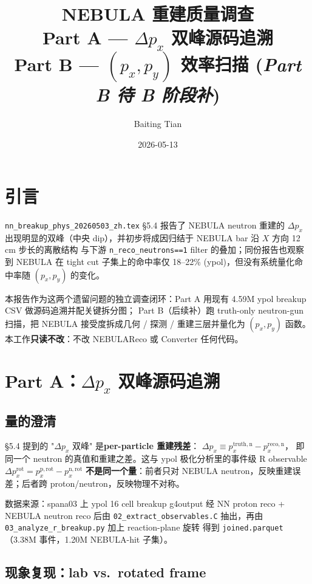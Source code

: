 \documentclass[a4paper,11pt]{ctexart}
\title{NEBULA 重建质量调查\\
       Part A --- $\Delta p_x$ 双峰源码追溯\\
       Part B --- $(p_x,p_y)$ 效率扫描 (\textit{Part B 待 B 阶段补}) }
\author{Baiting Tian}
\date{2026-05-13}
\begin{document}
\maketitle
\tableofcontents

\section{引言}

\texttt{nn\_breakup\_phys\_20260503\_zh.tex} \S5.4 报告了 NEBULA neutron 重建的 $\Delta p_x$
出现明显的双峰（中央 dip），并初步将成因归结于 NEBULA bar 沿 $X$ 方向 12 cm 步长的离散结构
与下游 \texttt{n\_reco\_neutrons==1} filter 的叠加；同份报告也观察到 NEBULA 在 tight cut 子集上的命中率仅
18--22\% (ypol)，但没有系统量化命中率随 $(p_x, p_y)$ 的变化。

本报告作为这两个遗留问题的独立调查闭环：Part A 用现有 4.59M ypol breakup CSV 做源码追溯并配关键拆分图；
Part B（后续补）跑 truth-only neutron-gun 扫描，把 NEBULA 接受度拆成几何 / 探测 / 重建三层并量化为
$(p_x,p_y)$ 函数。本工作\textbf{只读不改}：不改 NEBULAReco 或 Converter 任何代码。

\section{Part A：$\Delta p_x$ 双峰源码追溯}

\subsection{量的澄清}

\S5.4 提到的 "$\Delta p_x$ 双峰" 是\textbf{per-particle 重建残差}：
$\Delta p_x \equiv p_x^{\mathrm{truth,n}} - p_x^{\mathrm{reco,n}}$，
即同一个 neutron 的真值和重建之差。这与 ypol 极化分析里的事件级 R observable
$\Delta p_x^{\mathrm{rot}} = p_x^{\mathrm{p,rot}} - p_x^{\mathrm{n,rot}}$
\textbf{不是同一个量}：前者只对 NEBULA neutron，反映重建误差；后者跨 proton/neutron，反映物理不对称。

数据来源：spana03 上 ypol 16 cell breakup g4output 经 NN proton reco + NEBULA neutron reco 后由
\texttt{02\_extract\_observables.C} 抽出，再由 \texttt{03\_analyze\_r\_breakup.py} 加上 reaction-plane 旋转
得到 \texttt{joined.parquet}（3.38M 事件，1.20M NEBULA-hit 子集）。

\subsection{现象复现：lab vs.\ rotated frame}
\end{document}
